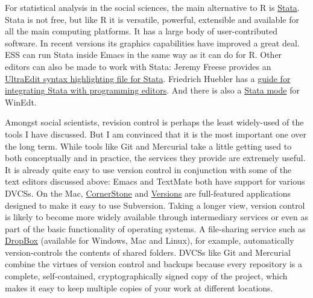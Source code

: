 \documentclass[11pt,article,oneside]{memoir}
\begin{document}
For statistical analysis in the social sciences, the main alternative to R is \href{http://www.stata.com/}{Stata}. Stata is not free, but like R it is versatile, powerful, extensible and available for all the main computing platforms. It has a large body of user-contributed software. In recent versions its graphics capabilities have improved a great deal. ESS can run Stata inside Emacs in the same way as it can do for R. Other editors can also be made to work with Stata: Jeremy Freese provides an  \href{http://www.jeremyfreese.com/#other%20research}{UltraEdit syntax highlighting file for Stata}. Friedrich Huebler has a \href{http://mysite.verizon.net/huebler/2005/20050310_Stata_editor.html}{guide for integrating Stata with programming editors}. And there is also a \href{http://www.winedt.org/Config/modes/Stata.php}{Stata mode} for WinEdt.   

Amongst social scientists, revision control is perhaps the least widely-used of the tools I have discussed. But I am convinced that it is the most important one over the long term. While tools like Git and Mercurial take a little getting used to both conceptually and in practice, the services they provide are extremely useful. It is already quite easy to use version control in conjunction with some of the text editors discussed above: Emacs and TextMate both have support for various DVCSs. On the Mac, \href{http://www.zennaware.com/cornerstone/}{CornerStone} and \href{http://www.versionsapp.com/}{Versions} are full-featured applications designed to make it easy to use Subversion. Taking a longer view, version control is likely to become more widely available through intermediary services or even as part of the basic functionality of operating systems. A file-sharing service such as \href{https://www.getdropbox.com/}{DropBox} (available for Windows, Mac and Linux), for example, automatically version-controls the contents of shared folders. DVCSs like Git and Mercurial combine the virtues of version control and backups because every repository is a complete, self-contained, cryptographically signed copy of the project, which makes it easy to keep multiple copies of your work at different locations. 
\end{document}
